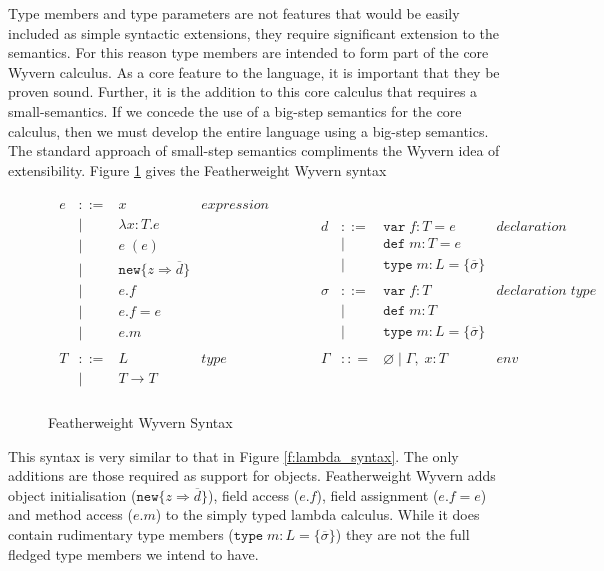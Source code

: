 \documentclass[11pt
              , a4paper
              , twoside
              , openright
              ]{report}
\numberwithin{case}{theorem}
\numberwithin{subcase}{case}
\begin{document}
Type members and type parameters are not features that would be easily included as simple syntactic extensions, they require significant extension to the semantics. For this reason type members are intended to form part of the core Wyvern calculus. As a core feature to the language, it is important that they be proven sound. Further, it is the addition to this core calculus that requires a small-semantics. If we concede the use of a big-step semantics for the core calculus, then we must develop the entire language using a big-step semantics. The standard approach of small-step semantics compliments the Wyvern idea of extensibility. Figure \ref{f:wyvern_syntax} gives the Featherweight Wyvern syntax
\begin{figure}[h]
\[
\begin{array}{lll}
\begin{array}{lllr}
e & ::= & x & expression \\
& | & \lambda x : T. e &\\
& | & e \; (e) &\\
& | & \texttt{new} \{z \Rightarrow \overline{d}\} &\\
& | & e.f &\\
& | & e.f = e &\\
& | & e.m &\\
&&\\
T & ::= & L & type \\
& | & T \rightarrow T &\\
 \end{array}
& ~~~~~~
&
\begin{array}{lllr}
d & ::= & \texttt{var} \; f : T = e &declaration\\
& | & \texttt{def} \; m : T = e &\\
& | & \texttt{type} \; m : L = \{\overline{\sigma}\} &\\
&&\\
\sigma & ::= & \texttt{var} \; f : T &declaration \; type\\
& | & \texttt{def} \; m : T &\\
& | & \texttt{type} \; m : L = \{\overline{\sigma}\} &\\
&&\\
\Gamma & :: = & \varnothing \; | \; \Gamma,\; x : T & env \\
\end{array}
\end{array}
\]
\caption{Featherweight Wyvern Syntax}
\label{f:wyvern_syntax}
\end{figure}
This syntax is very similar to that in Figure \ref{f:lambda_syntax}. The only additions are those required as support for objects. Featherweight Wyvern adds object initialisation ($\texttt{new} \{z \Rightarrow \overline{d}\}$), field access ($e.f$), field assignment ($e.f = e$) and method access ($e.m$) to the simply typed lambda calculus. While it does contain rudimentary type members ($\texttt{type} \; m : L = \{\overline{\sigma}\}$) they are not the full fledged type members we intend to have. 
\end{document}

